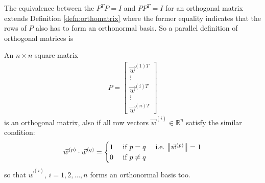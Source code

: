 The equivalence between the $P^TP=I$ and $PP^T = I$ for an orthogonal matrix extends Definition \ref{defn:orthomatrix} where the former equality indicates that the rows of $P$ also has to form an orthonormal basis. So a parallel definition of orthogonal matrices is
\begin{defn}
An $n \times n$ square matrix
\begin{align*}
P = \left[
\begin{array}{c}
\vec{w}^{(1)T}\\
\hline
\vdots \\
\hline
\vec{w}^{(i)T} \\
\hline
\vdots \\
\hline
\vec{w}^{(n)T}  
\end{array}
\right]
\end{align*}
is an orthogonal matrix, also if all row vectors $\vec{w}^{(i)} \in \mathbb{R}^n$ satisfy the similar condition:
\begin{align*}
\vec{w}^{(p)} \cdot \vec{w}^{(q)} =
\begin{cases}
1 &\text{ if } p = q \quad \text{ i.e.\ } \norm{\vec{w}^{(p)}} = 1 \\
0 &\text{ if } p \neq q    
\end{cases}
\end{align*}
so that $\vec{w}^{(i)}$, $i=1,2,\ldots,n$ forms an orthonormal basis too.
\end{defn}

